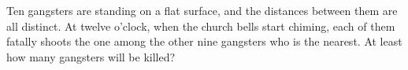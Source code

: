 Ten gangsters are standing on a flat surface, and the distances between them are all distinct. At twelve o'clock, when the church bells start chiming, each of them fatally shoots the one among the other nine gangsters who is the nearest. At least how many gangsters will be killed?
